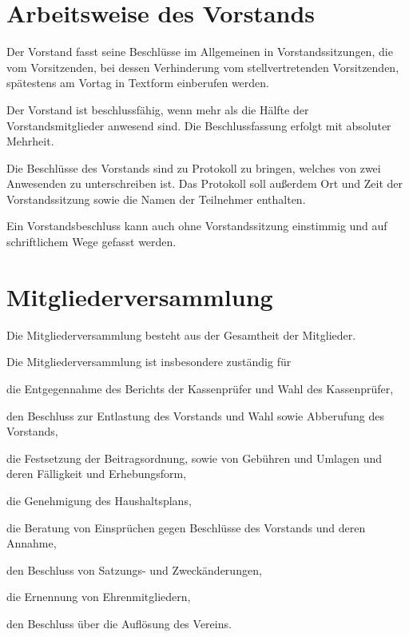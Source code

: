 \section{Arbeitsweise des Vorstands}
\begin{para}
	\item Der Vorstand fasst seine Beschlüsse im Allgemeinen in Vorstandssitzungen, die vom Vorsitzenden, bei dessen Verhinderung vom stellvertretenden Vorsitzenden, spätestens am Vortag in Textform einberufen werden. 
	\item Der Vorstand ist beschlussfähig, wenn mehr als die Hälfte der Vorstandsmitglieder anwesend sind. Die Beschlussfassung erfolgt mit absoluter Mehrheit.
	\item Die Beschlüsse des Vorstands sind zu Protokoll zu bringen, welches von zwei Anwesenden zu unterschreiben ist. Das Protokoll soll außerdem Ort und Zeit der Vorstandssitzung sowie die Namen der Teilnehmer enthalten.
	\item Ein Vorstandsbeschluss kann auch ohne Vorstandssitzung einstimmig und auf schriftlichem Wege gefasst werden.
\end{para}

\section{Mitgliederversammlung}
\begin{para}
	\item Die Mitgliederversammlung besteht aus der Gesamtheit der Mitglieder. 
	\item Die Mitgliederversammlung ist insbesondere zuständig für
	\begin{subpara}
		\item die Entgegennahme des Berichts der Kassenprüfer und Wahl des Kassenprüfer,
		\item den Beschluss zur Entlastung des Vorstands und Wahl sowie Abberufung des Vorstands,
		\item die Festsetzung der Beitragsordnung, sowie von Gebühren und Umlagen und deren Fälligkeit und Erhebungsform,
		\item die Genehmigung des Haushaltsplans,
		\item die Beratung von Einsprüchen gegen Beschlüsse des Vorstands und deren Annahme,
		\item den Beschluss von Satzungs- und Zweckänderungen,
		\item die Ernennung von Ehrenmitgliedern,
		\item den Beschluss über die Auflösung des Vereins.
	\end{subpara}
\end{para}

